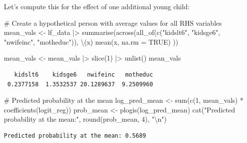 \documentclass[
  letterpaper,
  DIV=11,
  numbers=noendperiod]{scrreprt}
\newenvironment{Shaded}{\begin{snugshade}}{\end{snugshade}}
\newcommand{\AttributeTok}[1]{\textcolor[rgb]{0.40,0.45,0.13}{#1}}
\newcommand{\CommentTok}[1]{\textcolor[rgb]{0.37,0.37,0.37}{#1}}
\newcommand{\ConstantTok}[1]{\textcolor[rgb]{0.56,0.35,0.01}{#1}}
\newcommand{\DecValTok}[1]{\textcolor[rgb]{0.68,0.00,0.00}{#1}}
\newcommand{\FunctionTok}[1]{\textcolor[rgb]{0.28,0.35,0.67}{#1}}
\newcommand{\NormalTok}[1]{\textcolor[rgb]{0.00,0.23,0.31}{#1}}
\newcommand{\OtherTok}[1]{\textcolor[rgb]{0.00,0.23,0.31}{#1}}
\newcommand{\SpecialCharTok}[1]{\textcolor[rgb]{0.37,0.37,0.37}{#1}}
\newcommand{\StringTok}[1]{\textcolor[rgb]{0.13,0.47,0.30}{#1}}
\begin{document}
Let's compute this for the effect of one additional young child:

\begin{Shaded}
\begin{Highlighting}[]
\CommentTok{\# Create a hypothetical person with average values for all RHS variables}
\NormalTok{mean\_vals }\OtherTok{\textless{}{-}}\NormalTok{ lf\_data }\SpecialCharTok{|\textgreater{}}
    \FunctionTok{summarise}\NormalTok{(}\FunctionTok{across}\NormalTok{(}\FunctionTok{all\_of}\NormalTok{(}\FunctionTok{c}\NormalTok{(}\StringTok{"kidslt6"}\NormalTok{, }\StringTok{"kidsge6"}\NormalTok{, }\StringTok{"nwifeinc"}\NormalTok{, }\StringTok{"motheduc"}\NormalTok{)),}
\NormalTok{    \textbackslash{}(x) }\FunctionTok{mean}\NormalTok{(x, }\AttributeTok{na.rm =} \ConstantTok{TRUE}\NormalTok{)}
\NormalTok{    ))}

\NormalTok{mean\_vals }\OtherTok{\textless{}{-}}\NormalTok{ mean\_vals }\SpecialCharTok{|\textgreater{}}
    \FunctionTok{slice}\NormalTok{(}\DecValTok{1}\NormalTok{) }\SpecialCharTok{|\textgreater{}}
    \FunctionTok{unlist}\NormalTok{()}
\NormalTok{mean\_vals}
\end{Highlighting}
\end{Shaded}

\begin{verbatim}
   kidslt6    kidsge6   nwifeinc   motheduc 
 0.2377158  1.3532537 20.1289637  9.2509960 
\end{verbatim}

\begin{Shaded}
\begin{Highlighting}[]
\CommentTok{\# Predicted probability at the mean}
\NormalTok{log\_pred\_mean }\OtherTok{\textless{}{-}} \FunctionTok{sum}\NormalTok{(}\FunctionTok{c}\NormalTok{(}\DecValTok{1}\NormalTok{, mean\_vals) }\SpecialCharTok{*} \FunctionTok{coefficients}\NormalTok{(logit\_reg))}
\NormalTok{prob\_mean }\OtherTok{\textless{}{-}} \FunctionTok{plogis}\NormalTok{(log\_pred\_mean)}
\FunctionTok{cat}\NormalTok{(}\StringTok{"Predicted probability at the mean:"}\NormalTok{, }\FunctionTok{round}\NormalTok{(prob\_mean, }\DecValTok{4}\NormalTok{), }\StringTok{"}\SpecialCharTok{\textbackslash{}n}\StringTok{"}\NormalTok{)}
\end{Highlighting}
\end{Shaded}

\begin{verbatim}
Predicted probability at the mean: 0.5689 
\end{verbatim}
\end{document}
